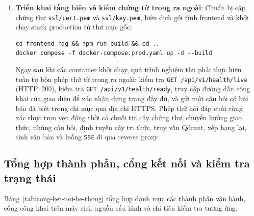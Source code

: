 \begin{enumerate}
    \item \textbf{Triển khai tầng biên và kiểm chứng từ trong ra ngoài}: Chuẩn bị cặp chứng thư \texttt{ssl/\allowbreak{}cert.\allowbreak{}pem} và \texttt{ssl/\allowbreak{}key.\allowbreak{}pem}, biên dịch gói tĩnh frontend và khởi chạy stack production từ thư mục gốc:
\begin{verbatim}
cd frontend_rag && npm run build && cd ..
docker compose -f docker-compose.prod.yaml up -d --build
\end{verbatim}
    Ngay sau khi các container khởi chạy, quá trình nghiệm thu phải thực hiện tuần tự bốn phép thử từ trong ra ngoài: kiểm tra \texttt{GET /\allowbreak{}api/\allowbreak{}v1/\allowbreak{}health/\allowbreak{}live} (HTTP~200), kiểm tra \texttt{GET /\allowbreak{}api/\allowbreak{}v1/\allowbreak{}health/\allowbreak{}ready}, truy cập đường dẫn công khai của giao diện để xác nhận dựng trang đầy đủ, và gửi một câu hỏi có bài báo đã biết trong chỉ mục qua địa chỉ HTTPS. Phép thử hỏi đáp cuối cùng xác thực trọn vẹn đồng thời cả chuỗi tin cậy chứng thư, chuyển hướng giao thức, nhúng câu hỏi, định tuyến cây tri thức, truy vấn Qdrant, xếp hạng lại, sinh văn bản và luồng \texttt{SSE} đi qua reverse proxy.
\end{enumerate}

\subsection{Tổng hợp thành phần, cổng kết nối và kiểm tra trạng thái}
\label{subsec:tong-hop-cong}

Bảng~\ref{tab:cong-ket-noi-he-thong} tổng hợp danh mục các thành phần vận hành, cổng công khai trên máy chủ, nguồn cấu hình và chỉ tiêu kiểm tra tương ứng.

